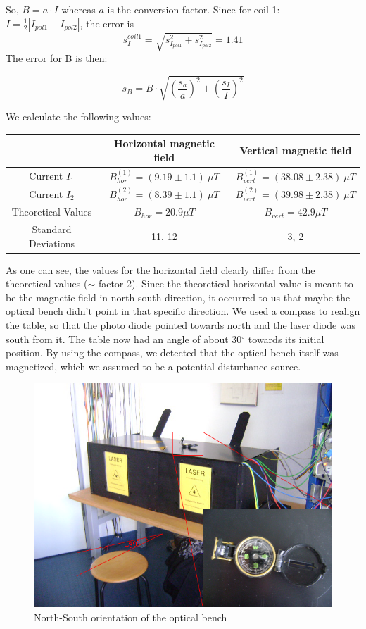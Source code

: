 So, $B=a\cdot I$ whereas $a$ is the conversion factor. Since for coil 1: \ $I=\frac{1}{2}|I_{pol1}-I_{pol2}|$, the error is $$s_I^{coil1} = \sqrt{s_{I_{pol1}}^2 + s_{I_{pol2}}^2} = 1.41$$
The error for B is then:

$$s_B = B\cdot\sqrt{\left(\frac{s_a}{a}\right)^2 + \left(\frac{s_I}{I}\right)^2}$$

We calculate the following values:

\begin{center}
\begin{tabular}[H]{c | c c}
 & Horizontal magnetic field & Vertical magnetic field \\ \hline
Current $I_1$ & $B_{hor}^{(1)} = (9.19 \pm 1.1)\ \mu T$ & $B_{vert}^{(1)} = (38.08 \pm 2.38)\ \mu T$\\
Current $I_2$& $B_{hor}^{(2)} = (8.39 \pm 1.1)\ \mu T$ & $B_{vert}^{(2)} = (39.98 \pm 2.38)\ \mu T$\\
Theoretical Values & $B_{hor} = 20.9 \mu T$ & $B_{vert} = 42.9 \mu T$\\
Standard Deviations & 11, 12 & 3, 2\\
\end{tabular}
\end{center}

As one can see, the values for the horizontal field clearly differ from the theoretical values ($\sim$ factor 2). Since the theoretical horizontal value is meant to be the magnetic field in north-south direction, it occurred to us that maybe the optical bench didn't point in that specific direction. We used a compass to realign the table, so that the photo diode pointed towards north and the laser diode was south from it. The table now had an angle of about 30$^\circ$ towards its initial position. By using the compass, we detected that the optical bench itself was magnetized, which we assumed to be a potential disturbance source.

\begin{figure}[H]
\centering \includegraphics[width=\textwidth]{BilderAusw/Nordsued.png}
\caption{North-South orientation of the optical bench}
\end{figure}

